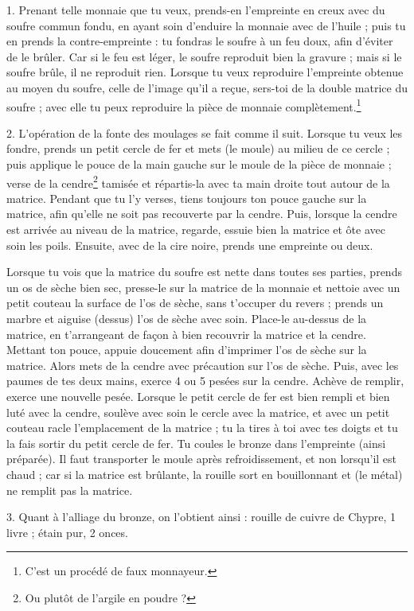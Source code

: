 \documentclass[a4paper, 11pt, oneside, polutonikogreek, french]{article}
\begin{document}
1. Prenant telle monnaie que tu veux, prends-en l'empreinte en creux avec du soufre commun fondu, en ayant soin d'enduire la monnaie avec de l'huile ; puis tu en prends la contre-empreinte : tu fondras le soufre à un feu doux, afin d'éviter de le brûler. Car si le feu est léger, le soufre reproduit bien la gravure ; mais si le soufre brûle, il ne reproduit rien. Lorsque tu veux reproduire l'empreinte obtenue au moyen du soufre, celle de l'image qu'il a reçue, sers-toi de la double matrice du soufre ; avec elle tu peux reproduire la pièce de monnaie complètement.\footnote{C'est un procédé de faux monnayeur.}

2. L'opération de la fonte des moulages se fait comme il suit. Lorsque tu veux les fondre, prends un petit cercle de fer et mets (le moule) au milieu de ce cercle ; puis applique le pouce de la main gauche sur le moule de la pièce de monnaie ; verse de la cendre\footnote{Ou plutôt de l'argile en poudre ?} tamisée et répartis-la avec ta main droite tout autour de la matrice. Pendant que tu l'y verses, tiens toujours ton pouce gauche sur la matrice, afin qu'elle ne soit pas recouverte par la cendre. Puis, lorsque la cendre est arrivée au niveau de la matrice, regarde, essuie bien la matrice et ôte avec soin les poils. Ensuite, avec de la cire noire, prends une empreinte ou deux.

Lorsque tu vois que la matrice du soufre est nette dans toutes ses parties, prends un os de sèche bien sec, presse-le sur la matrice de la monnaie et nettoie avec un petit couteau la surface de l'os de sèche, sans t'occuper du revers ; prends un marbre et aiguise (dessus) l'os de sèche avec soin. Place-le au-dessus de la matrice, en t'arrangeant de façon à bien recouvrir la matrice et la cendre. Mettant ton pouce, appuie doucement afin d'imprimer l'os de sèche sur la matrice. Alors mets de la cendre avec précaution sur l'os de sèche. Puis, avec les paumes de tes deux mains, exerce 4 ou 5 pesées sur la cendre. Achève de remplir, exerce une nouvelle pesée. Lorsque le petit cercle de fer est bien rempli et bien luté avec la cendre, soulève avec soin le cercle avec la matrice, et avec un petit couteau racle l'emplacement de la matrice ; tu la tires à toi avec tes doigts et tu la fais sortir du petit cercle de fer. Tu coules le bronze dans l'empreinte (ainsi préparée). Il faut transporter le moule après refroidissement, et non lorsqu'il est chaud ; car si la matrice est brûlante, la rouille sort en bouillonnant et (le métal) ne remplit pas la matrice.

3. Quant à l'alliage du bronze, on l'obtient ainsi : rouille de cuivre de Chypre, 1 livre ; étain pur, 2 onces.
\end{document}
